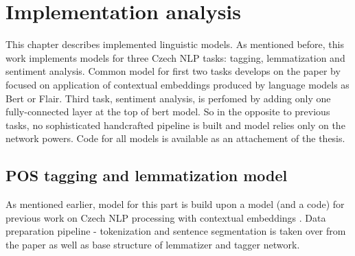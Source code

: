 \chapter{Implementation analysis}
\label{chap:impl}
This chapter describes implemented linguistic models. As mentioned before, this work implements models for three Czech NLP tasks: tagging, lemmatization and sentiment analysis. Common model for first two tasks develops on the paper by \cite[]{straka2019czech} focused on application of contextual embeddings produced by language models as Bert %
 or Flair. %
 Third task, sentiment analysis, is perfomed by adding only one fully-connected layer at the top of bert model. So in the opposite to previous tasks, no sophisticated handcrafted pipeline is built and model relies only on the network powers.
Code for all models is available as an attachement of the thesis.
 \section{POS tagging and lemmatization model}
As mentioned earlier, model for this part is build upon a model (and a code) for previous work on Czech NLP processing with contextual embeddings \cite[]{straka2019czech}. Data preparation %
pipeline - tokenization and sentence segmentation is taken over from the paper as well as base structure of lemmatizer and tagger network. 












